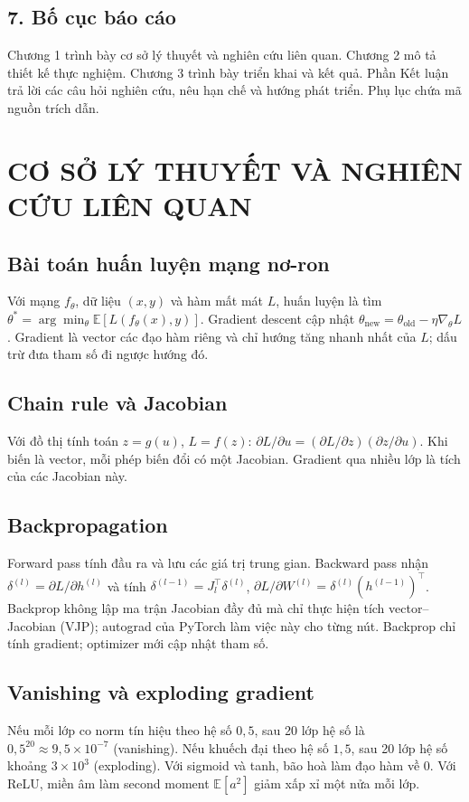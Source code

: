 \documentclass[12pt,a4paper]{report}
\begin{document}
\section*{7. Bố cục báo cáo}
Chương 1 trình bày cơ sở lý thuyết và nghiên cứu liên quan. Chương 2 mô tả thiết kế thực nghiệm. Chương 3 trình bày triển khai và kết quả. Phần Kết luận trả lời các câu hỏi nghiên cứu, nêu hạn chế và hướng phát triển. Phụ lục chứa mã nguồn trích dẫn.

\chapter{CƠ SỞ LÝ THUYẾT VÀ NGHIÊN CỨU LIÊN QUAN}

\section{Bài toán huấn luyện mạng nơ-ron}
Với mạng $f_\theta$, dữ liệu $(x,y)$ và hàm mất mát $L$, huấn luyện là tìm $\theta^\ast = \arg\min_\theta \mathbb E[L(f_\theta(x),y)]$. Gradient descent cập nhật $\theta_{\text{new}}=\theta_{\text{old}}-\eta\nabla_\theta L$. Gradient là vector các đạo hàm riêng và chỉ hướng tăng nhanh nhất của $L$; dấu trừ đưa tham số đi ngược hướng đó.

\section{Chain rule và Jacobian}
Với đồ thị tính toán $z=g(u)$, $L=f(z)$: $\partial L/\partial u = (\partial L/\partial z)(\partial z/\partial u)$. Khi biến là vector, mỗi phép biến đổi có một Jacobian. Gradient qua nhiều lớp là tích của các Jacobian này.

\section{Backpropagation}
Forward pass tính đầu ra và lưu các giá trị trung gian. Backward pass nhận $\delta^{(l)}=\partial L/\partial h^{(l)}$ và tính $\delta^{(l-1)} = J_l^\top\delta^{(l)}$, $\partial L/\partial W^{(l)} = \delta^{(l)}(h^{(l-1)})^\top$. Backprop không lập ma trận Jacobian đầy đủ mà chỉ thực hiện tích vector--Jacobian (VJP); autograd của PyTorch làm việc này cho từng nút. Backprop chỉ tính gradient; optimizer mới cập nhật tham số.

\section{Vanishing và exploding gradient}
Nếu mỗi lớp co norm tín hiệu theo hệ số $0{,}5$, sau 20 lớp hệ số là $0{,}5^{20}\approx9{,}5\times10^{-7}$ (vanishing). Nếu khuếch đại theo hệ số $1{,}5$, sau 20 lớp hệ số khoảng $3\times10^3$ (exploding). Với sigmoid và tanh, bão hoà làm đạo hàm về 0. Với ReLU, miền âm làm second moment $\mathbb E[a^2]$ giảm xấp xỉ một nửa mỗi lớp.
\end{document}
